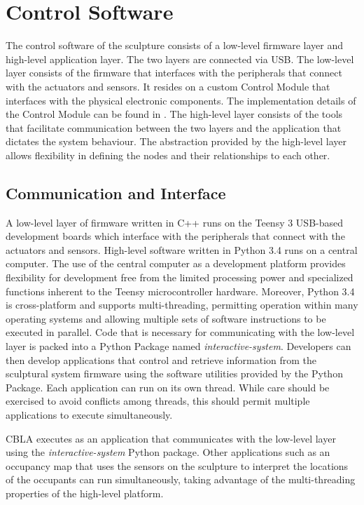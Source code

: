 \FloatBarrier
\section{Control Software}

The control software of the sculpture consists of a low-level firmware layer and high-level application layer. The two layers are connected via USB. The low-level layer consists of the firmware that interfaces with the peripherals that connect with the actuators and sensors. It resides on a custom Control Module that interfaces with the physical electronic components. The implementation details of the Control Module can be found in . The high-level layer consists of the tools that facilitate communication between the two layers and the application that dictates the system behaviour. The abstraction provided by the high-level layer allows flexibility in defining the nodes and their relationships to each other. 

\subsection{Communication and Interface}

A low-level layer of firmware written in C++ runs on the Teensy 3 USB-based development boards which interface with the peripherals that connect with the actuators and sensors. High-level software written in Python 3.4 runs on a central computer. The use of the central computer as a development platform provides flexibility for development free from the limited processing power and specialized functions inherent to the Teensy microcontroller hardware. Moreover, Python 3.4 is cross-platform and supports multi-threading, permitting operation within many operating systems and allowing multiple sets of software instructions to be executed in parallel. Code that is necessary for communicating with the low-level layer is packed into a Python Package named \textit{interactive-system}. Developers can then develop applications that control and retrieve information from the sculptural system firmware using the software utilities provided by the Python Package. Each application can run on its own thread. While care should be exercised to avoid conflicts among threads, this should permit multiple applications to execute simultaneously.	

CBLA executes as an application that communicates with the low-level layer using the \textit{interactive-system} Python package. Other applications such as an occupancy map that uses the sensors on the sculpture to interpret the locations of the occupants can run simultaneously, taking advantage of the multi-threading properties of the high-level platform.


